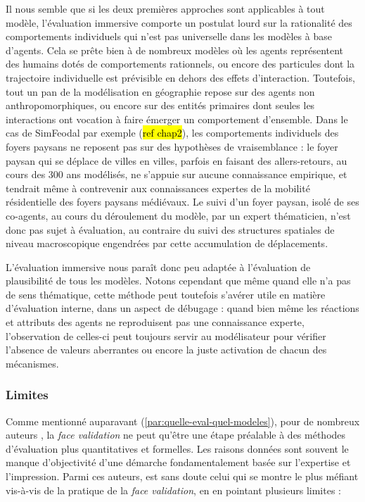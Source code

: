 Il nous semble que si les deux premières approches sont applicables à tout modèle, l'évaluation immersive comporte un postulat lourd sur la rationalité des comportements individuels qui n'est pas universelle dans les modèles à base d'agents.
Cela se prête bien à de nombreux modèles où les agents représentent des humains dotés de comportements rationnels, ou encore des particules dont la trajectoire individuelle est prévisible en dehors des effets d'interaction.
Toutefois, tout un pan de la modélisation en géographie repose sur des agents non anthropomorphiques, ou encore sur des entités primaires dont seules les interactions ont vocation à faire émerger un comportement d'ensemble.
Dans le cas de SimFeodal par exemple (\hl{ref chap2}), les comportements individuels des foyers paysans ne reposent pas sur des hypothèses de vraisemblance :
	le foyer paysan qui se déplace de villes en villes, parfois en faisant des allers-retours, au cours des 300 ans modélisés, ne s'appuie sur aucune connaissance empirique, et tendrait même à contrevenir aux connaissances expertes de la mobilité résidentielle des foyers paysans médiévaux.
Le suivi d'un foyer paysan, isolé de ses co-agents, au cours du déroulement du modèle, par un expert thématicien, n'est donc pas sujet à évaluation, au contraire du suivi des structures spatiales de niveau macroscopique engendrées par cette accumulation de déplacements.

L'évaluation immersive nous paraît donc peu adaptée à l'évaluation de plausibilité de tous les modèles.
Notons cependant que même quand elle n'a pas de sens thématique, cette méthode peut toutefois s'avérer utile en matière d'évaluation interne, dans un aspect de \og débugage\fg{} :
	quand bien même les réactions et attributs des agents ne reproduisent pas une connaissance experte, l'observation de celles-ci peut toujours servir au modélisateur pour vérifier l'absence de valeurs aberrantes ou encore la juste activation de chacun des mécanismes.


\subsubsection{Limites}

Comme mentionné auparavant (\ref{par:quelle-eval-quel-modeles}), pour de nombreux auteurs \autocite{hermann_validation_1967, balci_validation_1994, kennedy_verification_2006}, la \textit{face validation} ne peut qu'être une étape préalable à des méthodes d'évaluation plus quantitatives et formelles.
Les raisons données sont souvent le manque d'objectivité d'une démarche fondamentalement basée sur l'expertise et l'impression.
Parmi ces auteurs, \citeauthor{hermann_validation_1967} est sans doute celui qui se montre le plus méfiant vis-à-vis de la pratique de la \textit{face validation}, en en pointant plusieurs limites :

